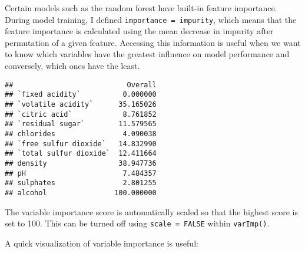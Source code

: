 \documentclass[
]{book}
\newenvironment{Shaded}{\begin{snugshade}}{\end{snugshade}}
\newcommand{\FunctionTok}[1]{\textcolor[rgb]{0.00,0.00,0.00}{#1}}
\newcommand{\NormalTok}[1]{#1}
\newcommand{\SpecialCharTok}[1]{\textcolor[rgb]{0.00,0.00,0.00}{#1}}
\begin{document}
Certain models such as the random forest have built-in feature importance. During model training, I defined \texttt{importance\ =\ \textquotesingle{}impurity\textquotesingle{}}, which means that the feature importance is calculated using the mean decrease in impurity after permutation of a given feature. Accessing this information is useful when we want to know which variables have the greatest influence on model performance and conversely, which ones have the least.

\begin{Shaded}
\end{Shaded}

\begin{verbatim}
##                           Overall
## `fixed acidity`          0.000000
## `volatile acidity`      35.165026
## `citric acid`            8.761852
## `residual sugar`        11.579565
## chlorides                4.090038
## `free sulfur dioxide`   14.832990
## `total sulfur dioxide`  12.411664
## density                 38.947736
## pH                       7.484357
## sulphates                2.801255
## alcohol                100.000000
\end{verbatim}

The variable importance score is automatically scaled so that the highest score is set to 100. This can be turned off using \texttt{scale\ =\ FALSE} within \texttt{varImp()}.

A quick visualization of variable importance is useful:
\end{document}
